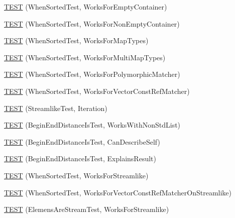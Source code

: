 \begin{DoxyCompactItemize}
\item 
\hyperlink{namespacetesting_1_1gmock__matchers__test_a76aaffd49c78fdee18f11fae5ea3f6fb}{T\+E\+ST} (When\+Sorted\+Test, Works\+For\+Empty\+Container)
\item 
\hyperlink{namespacetesting_1_1gmock__matchers__test_a2bfbef7e777d319e3d96fc98340bb558}{T\+E\+ST} (When\+Sorted\+Test, Works\+For\+Non\+Empty\+Container)
\item 
\hyperlink{namespacetesting_1_1gmock__matchers__test_acc4a96f3aa369fda8f554f5ac4495f4b}{T\+E\+ST} (When\+Sorted\+Test, Works\+For\+Map\+Types)
\item 
\hyperlink{namespacetesting_1_1gmock__matchers__test_ab5de36ad02781be67163ae24d08b5454}{T\+E\+ST} (When\+Sorted\+Test, Works\+For\+Multi\+Map\+Types)
\item 
\hyperlink{namespacetesting_1_1gmock__matchers__test_a587c3799433426782ccdcfe5cb07f5bc}{T\+E\+ST} (When\+Sorted\+Test, Works\+For\+Polymorphic\+Matcher)
\item 
\hyperlink{namespacetesting_1_1gmock__matchers__test_a0975bae51ce06a819dc1437134fd7f05}{T\+E\+ST} (When\+Sorted\+Test, Works\+For\+Vector\+Const\+Ref\+Matcher)
\item 
\hyperlink{namespacetesting_1_1gmock__matchers__test_a5aa4eed927d4a1a8ea306d5e47dce94f}{T\+E\+ST} (Streamlike\+Test, Iteration)
\item 
\hyperlink{namespacetesting_1_1gmock__matchers__test_add74820690e798ae8a365d08b68ddf71}{T\+E\+ST} (Begin\+End\+Distance\+Is\+Test, Works\+With\+Non\+Std\+List)
\item 
\hyperlink{namespacetesting_1_1gmock__matchers__test_aa4ef2a94a7d75aa6116e8537deaa5f56}{T\+E\+ST} (Begin\+End\+Distance\+Is\+Test, Can\+Describe\+Self)
\item 
\hyperlink{namespacetesting_1_1gmock__matchers__test_a89445da783c74dfa09c9c09531646f5b}{T\+E\+ST} (Begin\+End\+Distance\+Is\+Test, Explains\+Result)
\item 
\hyperlink{namespacetesting_1_1gmock__matchers__test_a8de8e3760418cfcd33913cd30f16d117}{T\+E\+ST} (When\+Sorted\+Test, Works\+For\+Streamlike)
\item 
\hyperlink{namespacetesting_1_1gmock__matchers__test_aa6bfe7b6cc288d93f60b9f52e095b233}{T\+E\+ST} (When\+Sorted\+Test, Works\+For\+Vector\+Const\+Ref\+Matcher\+On\+Streamlike)
\item 
\hyperlink{namespacetesting_1_1gmock__matchers__test_adb0f512a2369d69f056e42e1cc5f3fc2}{T\+E\+ST} (Elemens\+Are\+Stream\+Test, Works\+For\+Streamlike)
\item 

\end{DoxyCompactItemize}
